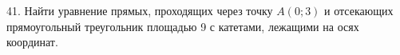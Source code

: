 41. Найти уравнение прямых, проходящих через точку $A(0;3)$ и отсекающих прямоугольный треугольник площадью 9 с катетами, лежащими на осях координат.\\
